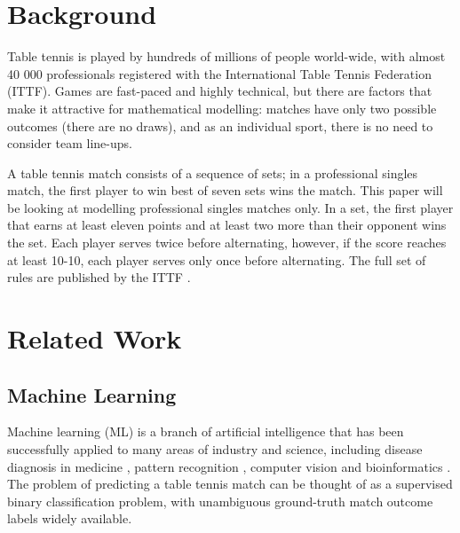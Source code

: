 \section{Background}
Table tennis is played by hundreds of millions of people world-wide, with almost 40 000 professionals registered with the International Table Tennis Federation (ITTF). Games are fast-paced and highly technical, but there are  factors that make it attractive for mathematical modelling: matches have only two possible outcomes (there are no draws), and as an individual sport, there is no need to consider team line-ups.

A table tennis match consists of a sequence of sets; in a professional singles match, the first player to win best of seven sets wins the match. 
This paper will be looking at modelling professional singles matches only.
In a set, the first player that earns at least eleven points and at least two more than their opponent wins the set. Each player serves twice before alternating, however, if the score reaches at least 10-10, each player serves only once before alternating.  
The full set of rules are published by the ITTF \cite{ITTF}.

\section{Related Work} \label{sec:relatedwork}
\subsection{Machine Learning}
Machine learning (ML) is a branch of artificial intelligence that has been successfully applied to many areas of industry and science, including disease diagnosis in medicine \cite{kourou2015machine}, pattern recognition \cite{weiss1989empirical}, computer vision \cite{khan2020machine} and bioinformatics \cite{larranaga2006machine}.
The problem of predicting a table tennis match can be thought of as a supervised binary classification problem, with unambiguous ground-truth match outcome labels widely available. %


